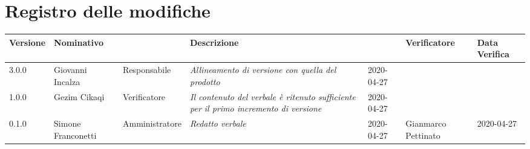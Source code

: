 \section*{Registro delle modifiche}
\renewcommand{\arraystretch}{1.8}

  \setlength\LTleft{-1.7cm}
  \begin{longtable}{|p{1.7cm}|p{2cm}|p{2.5cm}|p{3cm}|p{1.7cm}|p{2cm}|p{2.3cm}|}
    \hline

    \rowcolor{header}
    \textbf{Versione} & \textbf{Nominativo} & \centering{\textbf{Ruolo}} & \textbf{Descrizione} &      \centering{\textbf{Data}} & \textbf{Verificatore} & \textbf{Data Verifica} \\

    \hline
    3.0.0 & Giovanni Incalza & Responsabile & \small{\textit{Allineamento di versione con quella del prodotto}} & 2020-04-27 & &\\
    1.0.0 & Gezim Cikaqi & Verificatore & \small{\textit{Il contenuto del verbale è ritenuto sufficiente per il primo incremento di versione}} & 2020-04-27 & &\\
	0.1.0 & Simone Franconetti & Amministratore & \small{\textit{Redatto verbale}} & 2020-04-27 & Gianmarco Pettinato& 2020-04-27\\
    \hline
  \end{longtable}
  \setlength\LTleft{0cm}
